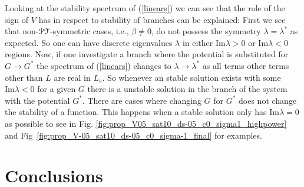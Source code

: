 \documentclass[aps,pre,showpacs,twocolumn]{revtex4}
\newcommand{\PT}{{\cal PT}}
\begin{document}
Looking at the stability spectrum of (\ref{linears}) we can see that the role of the sign of $V$ has in respect to stability of branches can be explained: First we see that non-$\PT$-symmetric cases, i.e., $\beta\neq 0$, do not possess the symmetry $\lambda=\lambda^*$ as expected. So one can have discrete eigenvalues $\lambda$ in either $\text{Im}\lambda>0$ or $\text{Im}\lambda<0$ regions. Now, if one investigate a branch where the potential is substituted for $G\to G^*$ the spectrum of (\ref{linears}) changes to $\lambda\to\lambda^*$ as all terms other terms other than $L$ are real in $L_s$. So whenever an stable solution exists with some $\text{Im}\lambda<0$ for a given $G$ there is a unstable solution in the branch of the system with the potential $G^*$. There are cases where changing $G$ for $G^*$ does not change the stability of a function. This happens when a stable solution only has $\text{Im}\lambda=0$ as possible to see in Fig. \ref{fig:prop_V05_sat10_ds-05_c0_sigma1_highpower} and Fig~\ref{fig:prop_V-05_sat10_ds-05_c0_sigma-1_final} for examples.


\section{Conclusions}
\end{document}
